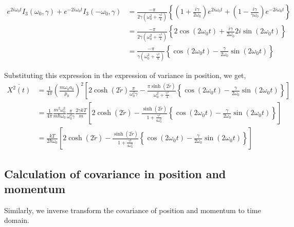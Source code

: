 \documentclass[12pt, twoside]{article}
\begin{document}
$\begin{aligned}e^{2i\omega_0 t}I_3(\omega_0,\gamma) + e^{-2i\omega_0 t}I_3(-\omega_0,\gamma) & = \frac{-\pi}{2\gamma(\omega_0^2 + \frac{\gamma^2}{4})}\left\{\left( 1 + \frac { i \gamma } { 2 \omega _ { 0 } } \right) e ^ { 2 i \omega _ { 0 } t } + \left( 1 - \frac { i \gamma } { \gamma \omega _ { 0 } } \right) e ^ { - 2 i \omega _ { 0 } t }\right\} \\ & = \frac{-\pi}{2\gamma(\omega_0^2 + \frac{\gamma^2}{4})} \left\{2\cos(2\omega_0 t) + \frac{i\gamma}{2 \omega_0} 2 i \sin(2\omega_0 t)\right\} \\&= \frac{-\pi}{\gamma(\omega_0^2 + \frac{\gamma^2}{4})} \left\{\cos(2\omega_0 t) - \frac{\gamma}{2 \omega_0} \sin(2\omega_0 t)\right\}  \end{aligned}$

Substituting this expression in the expression of variance in position, we get,
\begin{equation}\begin{aligned}\label{eq:x_average}
\overline{X ^ { 2 } ( t )} &= \frac{1}{4\pi}\left(\frac { m \omega _ { 0 } a_0 } { p _ { 0 } }\right)^2 \left[2\cosh(2\tilde{r})\frac{\pi}{\omega_0 ^2 \gamma} - \frac{\pi\sinh(2\tilde{r})}{\omega_0 ^2+ \frac{\gamma^2}{4}}\left\{\cos(2\omega_0 t) - \frac{\gamma}{2 \omega_0}\sin(2\omega_0 t)\right\}\right] \\& = \frac{1}{4\pi} \frac{m^2 \omega_0^2}{m \hbar \omega_0} \frac{\pi}{\omega_0 ^2 \gamma} \frac{2\gamma k T}{m} \left[2\cosh(2\tilde{r}) - \frac{\sinh(2\tilde{r})}{1 + \frac{\gamma^2}{4\omega_0 ^2}}\left\{\cos(2\omega_0 t) - \frac{\gamma}{2 \omega_0}\sin(2\omega_0 t)\right\}\right] \\& = \frac{kT}{2 \hbar \omega_0} \left[2\cosh(2\tilde{r}) - \frac{\sinh(2\tilde{r})}{1 + \frac{\gamma^2}{4\omega_0 ^2}}\left\{\cos(2\omega_0 t) - \frac{\gamma}{2 \omega_0}\sin(2\omega_0 t)\right\}\right]
\end{aligned}\end{equation}
\subsection{Calculation of covariance in position and momentum}
Similarly, we inverse transform the covariance of position and momentum to time domain. 
\end{document}

